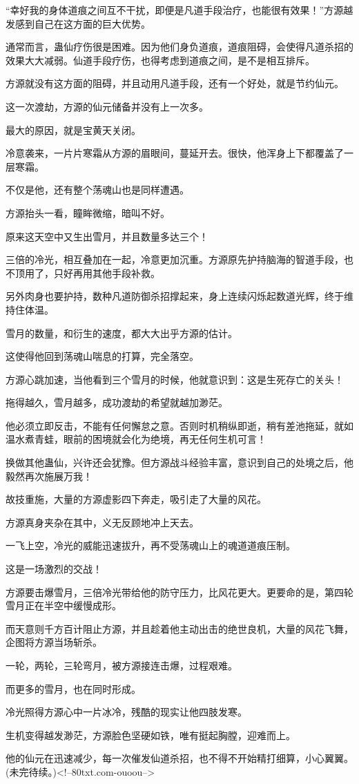 \begin{this_body}
“幸好我的身体道痕之间互不干扰，即便是凡道手段治疗，也能很有效果！”方源越发感到自己在这方面的巨大优势。

通常而言，蛊仙疗伤很是困难。因为他们身负道痕，道痕阻碍，会使得凡道杀招的效果大大减弱。仙道手段疗伤，也得考虑到道痕之间，是不是相互排斥。

方源就没有这方面的阻碍，并且动用凡道手段，还有一个好处，就是节约仙元。

这一次渡劫，方源的仙元储备并没有上一次多。

最大的原因，就是宝黄天关闭。

冷意袭来，一片片寒霜从方源的眉眼间，蔓延开去。很快，他浑身上下都覆盖了一层寒霜。

不仅是他，还有整个荡魂山也是同样遭遇。

方源抬头一看，瞳眸微缩，暗叫不好。

原来这天空中又生出雪月，并且数量多达三个！

三倍的冷光，相互叠加在一起，冷意更加沉重。方源原先护持脑海的智道手段，也不顶用了，只好再用其他手段补救。

另外肉身也要护持，数种凡道防御杀招撑起来，身上连续闪烁起数道光辉，终于维持住体温。

雪月的数量，和衍生的速度，都大大出乎方源的估计。

这使得他回到荡魂山喘息的打算，完全落空。

方源心跳加速，当他看到三个雪月的时候，他就意识到：这是生死存亡的关头！

拖得越久，雪月越多，成功渡劫的希望就越加渺茫。

他必须立即反击，不能有任何懈怠之意。否则时机稍纵即逝，稍有差池拖延，就如温水煮青蛙，眼前的困境就会化为绝境，再无任何生机可言！

换做其他蛊仙，兴许还会犹豫。但方源战斗经验丰富，意识到自己的处境之后，他毅然再次施展万我！

故技重施，大量的方源虚影四下奔走，吸引走了大量的风花。

方源真身夹杂在其中，义无反顾地冲上天去。

一飞上空，冷光的威能迅速拔升，再不受荡魂山上的魂道道痕压制。

这是一场激烈的交战！

方源要击爆雪月，三倍冷光带给他的防守压力，比风花更大。更要命的是，第四轮雪月正在半空中缓慢成形。

而天意则千方百计阻止方源，并且趁着他主动出击的绝世良机，大量的风花飞舞，企图将方源当场斩杀。

一轮，两轮，三轮弯月，被方源接连击爆，过程艰难。

而更多的雪月，也在同时形成。

冷光照得方源心中一片冰冷，残酷的现实让他四肢发寒。

生机变得越发渺茫，方源脸色坚硬如铁，唯有挺起胸膛，迎难而上。

他的仙元在迅速减少，每一次催发仙道杀招，也不得不开始精打细算，小心翼翼。(未完待续。)<!--80txt.com-ouoou-->

\end{this_body}

